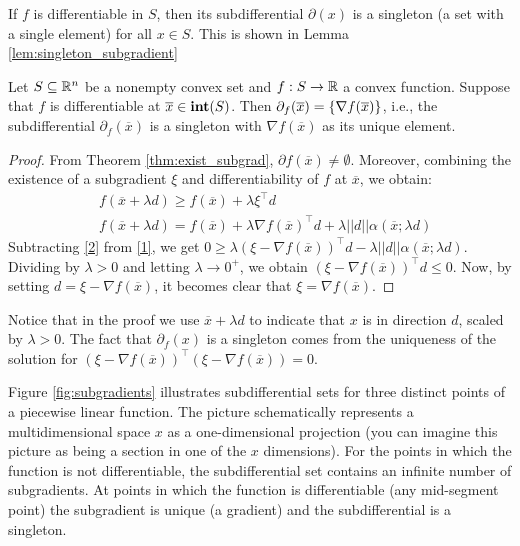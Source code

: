If $f$ is differentiable in $S$, then its subdifferential $\partial(x)$ is a singleton (a set with a single element) for all $x \in S$. This is shown in Lemma \ref{lem:singleton_subgradient}
%
\begin{lemma}\label{lem:singleton_subgradient}
	Let $S \subseteq \mathbb{R}^n$ be a nonempty convex set and $f:S \to \mathbb{R}$ a convex function. Suppose that $f$ is differentiable at $\overline{x} \in \mathop{\bf int}(S)$. Then $\partial_f(\overline{x}) = \left\{ \nabla f(\overline{x}) \right \}$, i.e., the subdifferential $\partial_f(\overline{x})$ is a singleton with $\nabla f(\overline{x})$ as its unique element.
\end{lemma}
%
\begin{proof}
	From Theorem \ref{thm:exist_subgrad}, $\partial f(\overline{x}) \neq \emptyset$. Moreover, combining the existence of a subgradient $\xi$ and differentiability of $f$ at $\overline{x}$, we obtain:
	\begin{align}
	&f(\overline{x} + \lambda d) \geq f(\overline{x}) + \lambda \xi^\top d \label{1}\\
	&f(\overline{x} + \lambda d) = f(\overline{x}) + \lambda \nabla f(\overline{x})^\top d + \lambda ||d||\alpha(\overline{x}; \lambda d) \label{2}
	\end{align}
	Subtracting \eqref{2} from \eqref{1}, we get 
	$
	0 \geq \lambda(\xi - \nabla f(\overline{x}))^\top d -\lambda ||d||\alpha(\overline{x}; \lambda d).
	$
	Dividing by $\lambda > 0$ and letting $\lambda \to 0^+$, we obtain $(\xi - \nabla f(\overline{x}))^\top d \leq 0$. Now, by setting $d = \xi - \nabla f(\overline{x})$, it becomes clear that $\xi = \nabla f(\overline{x})$.
\end{proof}

Notice that in the proof we use $\overline{x} + \lambda d$ to indicate that $x$ is in direction $d$, scaled by $\lambda > 0$. The fact that $\partial_f(x)$ is a singleton comes from the uniqueness of the solution for $(\xi - \nabla f(\overline{x}))^\top(\xi - \nabla f(\overline{x})) = 0$.

Figure \ref{fig:subgradients} illustrates subdifferential sets for three distinct points of a piecewise linear function. The picture schematically represents a multidimensional space $x$ as a one-dimensional projection (you can imagine this picture as being a section in one of the $x$ dimensions). For the points in which the function is not differentiable, the subdifferential set contains an infinite number of subgradients. At points in which the function is differentiable (any mid-segment point) the subgradient is unique (a gradient) and the subdifferential is a singleton.

